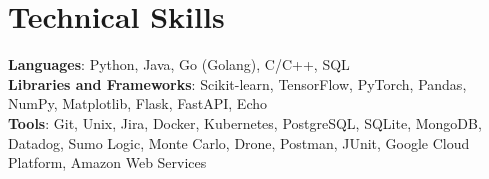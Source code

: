 \documentclass[letterpaper,11pt]{article}
\begin{document}
\section{Technical Skills}
 \begin{itemize}[leftmargin=0.15in, label={}]
    \small{\item{
     \textbf{Languages}{: Python, Java, Go (Golang), C/C++, SQL} \vspace{1.5pt}\\
     \textbf{Libraries and Frameworks}{: Scikit-learn, TensorFlow, PyTorch, Pandas, NumPy, Matplotlib, Flask, FastAPI, Echo} \vspace{1.5pt}\\
     \textbf{Tools}{: Git, Unix, Jira, Docker, Kubernetes, PostgreSQL, SQLite, MongoDB, Datadog, Sumo Logic, Monte Carlo, Drone, Postman, JUnit, Google Cloud Platform, Amazon Web Services} \\
    }}
 \end{itemize}


\end{document}
